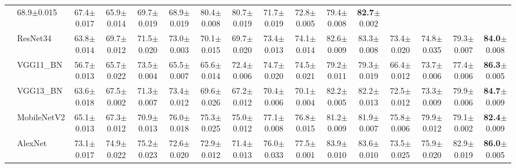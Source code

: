 \documentclass[preprint,number,5p,twocolumn]{elsarticle}
\begin{document}
\begin{table}[!ht]
{\begin{tabular}{l|lcccccccccccccc}
        & 68.9{\tiny$\pm$0.015} & 67.4{\tiny$\pm$0.017}
        & 65.9{\tiny$\pm$0.014} & 69.7{\tiny$\pm$0.019} & 68.9{\tiny$\pm$0.019}
        & 80.4{\tiny$\pm$0.008} & 80.7{\tiny$\pm$0.019}
        & 71.7{\tiny$\pm$0.019} & 72.8{\tiny$\pm$0.005}
        & 79.4{\tiny$\pm$0.008}
        & \textbf{82.7}{\tiny$\pm$0.002} \\
      & ResNet34
        & 63.8{\tiny$\pm$0.014} & 69.7{\tiny$\pm$0.012} & 71.5{\tiny$\pm$0.020}
        & 73.0{\tiny$\pm$0.003} & 70.1{\tiny$\pm$0.015}
        & 69.7{\tiny$\pm$0.020} & 73.4{\tiny$\pm$0.013} & 74.1{\tiny$\pm$0.014}
        & 82.6{\tiny$\pm$0.009} & 83.3{\tiny$\pm$0.008}
        & 73.4{\tiny$\pm$0.020} & 74.8{\tiny$\pm$0.035}
        & 79.3{\tiny$\pm$0.007}
        & \textbf{84.0}{\tiny$\pm$0.008} \\
      & VGG11\_BN
        & 56.7{\tiny$\pm$0.013} & 65.7{\tiny$\pm$0.022} & 73.5{\tiny$\pm$0.004}
        & 65.5{\tiny$\pm$0.007} & 65.6{\tiny$\pm$0.014}
        & 72.4{\tiny$\pm$0.006} & 74.7{\tiny$\pm$0.020} & 74.5{\tiny$\pm$0.021}
        & 79.2{\tiny$\pm$0.011} & 79.3{\tiny$\pm$0.019}
        & 66.4{\tiny$\pm$0.012} & 73.7{\tiny$\pm$0.006}
        & 77.4{\tiny$\pm$0.006}
        & \textbf{86.3}{\tiny$\pm$0.005} \\
      & VGG13\_BN
        & 63.6{\tiny$\pm$0.018} & 67.5{\tiny$\pm$0.002} & 71.3{\tiny$\pm$0.007}
        & 73.4{\tiny$\pm$0.012} & 69.6{\tiny$\pm$0.026}
        & 67.2{\tiny$\pm$0.012} & 70.4{\tiny$\pm$0.006} & 70.1{\tiny$\pm$0.004}
        & 82.2{\tiny$\pm$0.005} & 82.2{\tiny$\pm$0.013}
        & 72.5{\tiny$\pm$0.012} & 73.3{\tiny$\pm$0.009}
        & 79.9{\tiny$\pm$0.006}
        & \textbf{84.7}{\tiny$\pm$0.009} \\
      & MobileNetV2
        & 65.1{\tiny$\pm$0.013} & 67.3{\tiny$\pm$0.012} & 70.9{\tiny$\pm$0.013}
        & 76.0{\tiny$\pm$0.018} & 75.3{\tiny$\pm$0.025}
        & 75.0{\tiny$\pm$0.012} & 77.1{\tiny$\pm$0.008} & 76.8{\tiny$\pm$0.015}
        & 81.2{\tiny$\pm$0.009} & 81.9{\tiny$\pm$0.007}
        & 75.8{\tiny$\pm$0.006} & 79.9{\tiny$\pm$0.012}
        & 79.1{\tiny$\pm$0.002}
        & \textbf{82.4}{\tiny$\pm$0.009} \\
      & AlexNet
        & 73.1{\tiny$\pm$0.017} & 74.9{\tiny$\pm$0.022} & 75.2{\tiny$\pm$0.023}
        & 72.6{\tiny$\pm$0.020} & 72.9{\tiny$\pm$0.012}
        & 71.4{\tiny$\pm$0.013} & 76.0{\tiny$\pm$0.033} & 77.5{\tiny$\pm$0.001}
        & 83.9{\tiny$\pm$0.010} & 83.6{\tiny$\pm$0.010}
        & 73.5{\tiny$\pm$0.025} & 75.9{\tiny$\pm$0.020}
        & 82.9{\tiny$\pm$0.019}
        & \textbf{86.0}{\tiny$\pm$0.005} \\

\end{tabular}}
\end{table}
\end{document}
